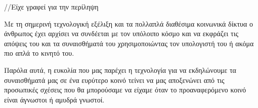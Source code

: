 //Είχε γραφεί για την περίληψη

Με τη σημερινή τεχνολογική εξέλιξη και τα πολλαπλά 
διαθέσιμα κοινωνικά δίκτυα ο άνθρωπος έχει αρχίσει 
να συνδέεται με τον υπόλοιπο κόσμο και να εκφράζει 
τις απόψεις του και τα συναισθήματά του χρησιμοποιώντας
τον υπολογιστή του ή ακόμα πιο απλά το κινητό του.

Παρόλα αυτά, η ευκολία που μας παρέχει η τεχνολογία
για να εκδηλώνουμε τα συναισθήματά μας σε ένα ευρύτερο κοινό
τείνει να μας αποξενώνει από τις προσωπικές σχέσεις που θα 
μπορούσαμε να είχαμε όταν το προαναφερόμενο κοινό είναι 
άγνωστοι ή αμυδρά γνωστοί.